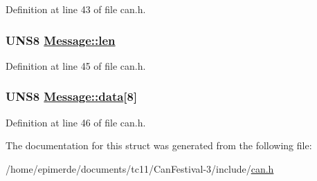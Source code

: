 Definition at line 43 of file can.h.\hypertarget{structMessage_d1dd9a88dda088ff4c7073d49613613d}{
\subsubsection[len]{\setlength{\rightskip}{0pt plus 5cm}UNS8 \hyperlink{structMessage_d1dd9a88dda088ff4c7073d49613613d}{Message::len}}}
\label{structMessage_d1dd9a88dda088ff4c7073d49613613d}




Definition at line 45 of file can.h.\hypertarget{structMessage_229865b09691e658677ba76f2d82ce89}{
\subsubsection[data]{\setlength{\rightskip}{0pt plus 5cm}UNS8 \hyperlink{structMessage_229865b09691e658677ba76f2d82ce89}{Message::data}\mbox{[}8\mbox{]}}}
\label{structMessage_229865b09691e658677ba76f2d82ce89}




Definition at line 46 of file can.h.

The documentation for this struct was generated from the following file:\begin{CompactItemize}
\item 
/home/epimerde/documents/tc11/Can\-Festival-3/include/\hyperlink{can_8h}{can.h}\end{CompactItemize}
